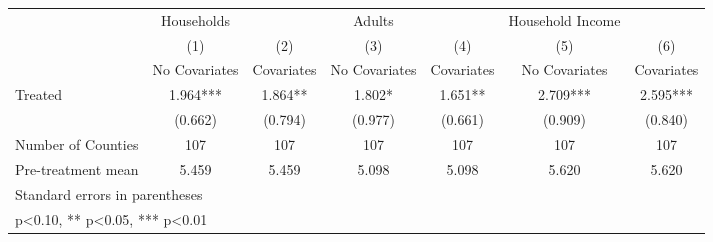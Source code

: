 {
\def\sym#1{\ifmmode^{#1}\else\(^{#1}\)\fi}
\begin{tabular}{l*{6}{c}}
\hline\hline
            &  Households   &               &      Adults   &               &Household Income   &               \\
            &\multicolumn{1}{c}{(1)}&\multicolumn{1}{c}{(2)}&\multicolumn{1}{c}{(3)}&\multicolumn{1}{c}{(4)}&\multicolumn{1}{c}{(5)}&\multicolumn{1}{c}{(6)}\\
            &\multicolumn{1}{c}{No Covariates}&\multicolumn{1}{c}{Covariates}&\multicolumn{1}{c}{No Covariates}&\multicolumn{1}{c}{Covariates}&\multicolumn{1}{c}{No Covariates}&\multicolumn{1}{c}{Covariates}\\
\hline
Treated     &       1.964***&       1.864** &       1.802*  &       1.651** &       2.709***&       2.595***\\
            &     (0.662)   &     (0.794)   &     (0.977)   &     (0.661)   &     (0.909)   &     (0.840)   \\
\hline
Number of Counties&         107   &         107   &         107   &         107   &         107   &         107   \\
Pre-treatment mean&       5.459   &       5.459   &       5.098   &       5.098   &       5.620   &       5.620   \\
\hline\hline
\multicolumn{7}{l}{\footnotesize Standard errors in parentheses}\\
\multicolumn{7}{l}{\footnotesize * p<0.10, ** p<0.05, *** p<0.01}\\
\end{tabular}
}
